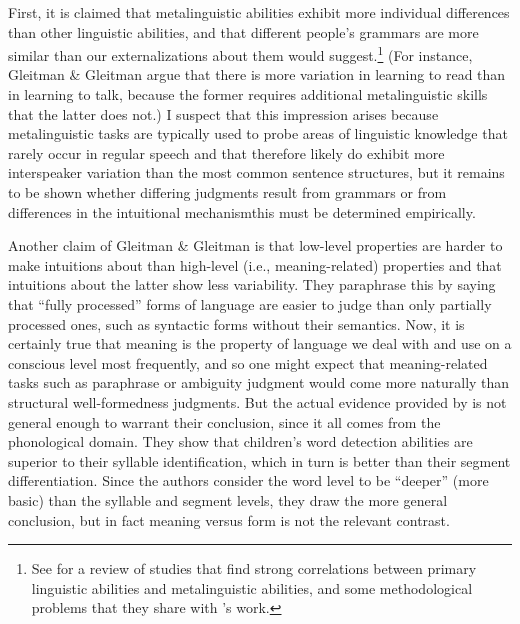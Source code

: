 First, it is claimed that metalinguistic abilities exhibit more individual differences than other linguistic abilities, and that different people's grammars are more similar than our externalizations about them would suggest.\footnote{See  \citet{VanKleeck1982} for a review of studies that find strong correlations between primary linguistic abilities and metalinguistic abilities, and some methodological problems that they share with \citeauthor{GleitmanEtAl1979}'s work.}
 (For instance, Gleitman \& Gleitman argue that there is more variation in learning to read than in learning to talk, because the former requires additional metalinguistic skills that the latter does not.) I suspect that this impression arises because metalinguistic tasks are typically used to probe areas of linguistic knowledge that rarely occur in regular speech and that therefore likely do exhibit more interspeaker variation than the most common sentence structures, but it remains to be shown whether differing judgments result from grammars or from differences in the intuitional mechanism\schdash{}this must be determined empirically.

Another claim of Gleitman \& Gleitman is that low-level properties are harder to make intuitions about than high-level (i.e., meaning-related) properties and that intuitions about the latter show less variability. They paraphrase this by saying that ``fully processed'' forms of language are easier to judge than only partially processed ones, such as syntactic forms without their semantics. Now, it is certainly true that meaning is the property of language we deal with and use on a conscious level most frequently, and so one might expect that meaning-related tasks such as paraphrase or ambiguity judgment would come more naturally than structural well-formedness judgments. But the actual evidence provided by \citeauthor{HirshPasekEtAl1978} 
is not general enough to warrant their conclusion, since it all comes from the phonological domain. They show that children's word detection abilities are superior to their syllable identification, which in turn is better than their segment differentiation. Since the authors consider the word level to be ``deeper'' (more basic) than the syllable and segment levels, they draw the more general conclusion, but in fact meaning versus form is not the relevant contrast.




